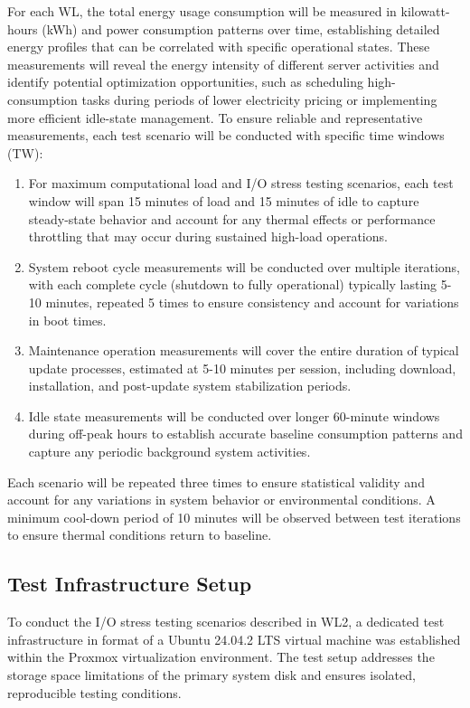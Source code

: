 For each WL, the total energy usage consumption will be measured in kilowatt-hours (kWh) and power
consumption patterns over time, establishing detailed energy profiles that can be
correlated with specific operational states. These measurements will reveal the
energy intensity of different server activities and identify potential
optimization opportunities, such as scheduling high-consumption tasks during
periods of lower electricity pricing or implementing more efficient idle-state
management.
\newpage
To ensure reliable and representative measurements, each test scenario will be
conducted with specific time windows (TW):

\begin{enumerate}[label=TW\arabic*]
    \item For maximum computational load and I/O stress testing scenarios, each
    test window will span 15 minutes of load and 15 minutes of idle to capture steady-state 
    behavior and account for any thermal effects or performance throttling that may occur during
    sustained high-load operations.

    \item System reboot cycle measurements will be conducted over multiple
    iterations, with each complete cycle (shutdown to fully operational)
    typically lasting 5-10 minutes, repeated 5 times to ensure consistency and
    account for variations in boot times.

    \item Maintenance operation measurements will cover the entire duration of
    typical update processes, estimated at 5-10 minutes per session, including
    download, installation, and post-update system stabilization periods.

    \item Idle state measurements will be conducted over longer 60-minute windows
    during off-peak hours to establish accurate baseline consumption patterns and
    capture any periodic background system activities.
\end{enumerate}

Each scenario will be repeated three times to ensure statistical validity and
account for any variations in system behavior or environmental conditions. A
minimum cool-down period of 10 minutes will be observed between test iterations
to ensure thermal conditions return to baseline.

\subsection{Test Infrastructure Setup}
\label{methodology:test-infrastructure-setup}
To conduct the I/O stress testing scenarios described in WL2, a dedicated test infrastructure in format
of a Ubuntu 24.04.2 LTS virtual machine was established within the Proxmox virtualization environment. 
The test setup addresses the storage space limitations of the primary system disk and ensures 
isolated, reproducible testing conditions.

